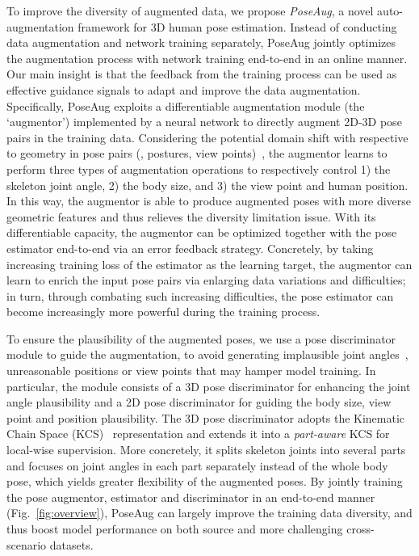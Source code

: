 \documentclass[final]{cvpr}
\begin{document}
To improve the diversity of augmented data, we propose \textit{PoseAug}, a novel auto-augmentation framework for 3D human pose estimation.
Instead of conducting data augmentation and network training separately, PoseAug jointly optimizes the augmentation process with network training end-to-end in an online manner.
Our main insight is that the feedback from the training process can be used as effective guidance signals to adapt and improve the data augmentation.
Specifically, PoseAug exploits a differentiable augmentation module (the `augmentor') {implemented by a neural network} to directly augment 2D-3D pose pairs in the training data.
Considering the potential domain shift with respective to geometry in pose pairs (\eg, postures, view points)~\cite{rhodin2018unsupervised,Li_2020_CVPR,zhang2020inference}, the augmentor learns to perform three types of augmentation operations to respectively control 1) the skeleton joint angle, 2) the body size, and 3) the view point and human position.
In this way, the augmentor is able to produce augmented poses with more diverse geometric features and thus relieves the diversity limitation issue.
With its differentiable capacity, the augmentor can be optimized together with the pose estimator end-to-end via an error feedback strategy.
Concretely, by taking increasing training loss of the estimator as the learning target, the augmentor can learn to enrich the input pose pairs via enlarging data variations and difficulties; in turn, through combating such increasing difficulties, the pose estimator can become increasingly more powerful during the training process.


To ensure the plausibility of the augmented poses, we use a pose discriminator module to guide the augmentation, to avoid generating implausible joint angles~\cite{akhter2015joint_angle_limit}, unreasonable positions or view points that may hamper model training. In particular, the module consists of a 3D pose discriminator for enhancing the joint angle plausibility and a 2D pose discriminator for guiding the body size, view point and position plausibility. The 3D pose discriminator adopts the Kinematic Chain Space (KCS)~\cite{wandt2019repnet} representation and extends it into a \textit{part-aware} KCS for local-wise supervision. More concretely, it splits skeleton joints into several parts and focuses on joint angles in each part separately instead of the whole body pose, which yields greater flexibility of the augmented poses. 
By jointly training the pose augmentor, estimator and discriminator in an end-to-end manner (Fig.~\ref{fig:overview}), PoseAug can largely improve the training data diversity, and thus boost model performance on both source and more challenging cross-scenario datasets. 
\end{document}
